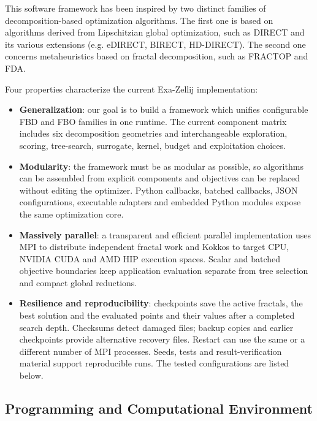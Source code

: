 This software framework has been inspired by two distinct families of
decomposition-based optimization algorithms. The first one is based on
algorithms derived from Lipschitzian global optimization, such as DIRECT
and its various extensions (e.g. eDIRECT, BIRECT, HD-DIRECT). The second
one concerns metaheuristics based on fractal decomposition, such as
FRACTOP and FDA.

Four properties characterize the current Exa-Zellij implementation:
\begin{itemize}
\item \textbf{Generalization}: our goal is to build a framework which
unifies configurable FBD and FBO families in one runtime. The current
component matrix includes six decomposition geometries and interchangeable
exploration, scoring, tree-search, surrogate, kernel, budget and
exploitation
choices.

\item \textbf{Modularity}: the framework must be as modular as possible,
so algorithms can be assembled from explicit components and objectives
can be replaced without editing the optimizer. Python callbacks, batched
callbacks, JSON configurations, executable adapters and embedded Python
modules expose the same optimization core.

\item \textbf{Massively parallel}: a transparent and efficient parallel
implementation uses MPI to distribute independent fractal work and
Kokkos to target CPU, NVIDIA CUDA and AMD HIP execution spaces. Scalar and
batched objective boundaries keep application evaluation separate from tree
selection and compact global reductions.

\item \textbf{Resilience and reproducibility}: checkpoints save the active
fractals, the best solution and the evaluated points and their values after
a completed search depth. Checksums detect damaged files; backup copies
and earlier checkpoints provide alternative recovery files. Restart can
use the same or a different number of MPI processes. Seeds, tests and
result-verification material support reproducible runs. The tested
configurations are listed below.
\end{itemize}

\subsection{Programming and Computational Environment}
\label{sec::Zellij:environment_capabilities}

